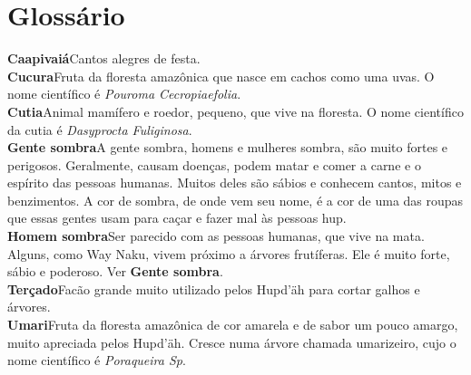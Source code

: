 \blankpage
\chapter{Glossário}


\textbf{Caapivaiá}\quad Cantos alegres de festa.\\
\textbf{Cucura}\quad Fruta da floresta amazônica que nasce em cachos
como uma uvas. O nome científico é \textit{Pouroma Cecropiaefolia}.\\
\textbf{Cutia}\quad Animal mamífero e roedor, pequeno, que vive na floresta. O nome
científico da cutia é \textit{Dasyprocta Fuliginosa}.\\
\textbf{Gente sombra}\quad A gente sombra, homens e mulheres sombra, são
muito fortes e perigosos. Geralmente, causam doenças, podem matar
e comer a carne e o espírito das pessoas humanas. Muitos deles
são sábios e conhecem cantos, mitos e benzimentos. A cor de
sombra, de onde vem seu nome, é a cor de uma das roupas que essas gentes
usam para caçar e fazer mal às pessoas hup.\\
\textbf{Homem sombra}\quad Ser parecido com as pessoas
humanas, que vive na mata. Alguns, como Way Naku, vivem próximo a árvores frutíferas. Ele
é muito forte, sábio e poderoso. Ver \textbf{Gente­ sombra}.\\
\textbf{Terçado}\quad Facão grande muito utilizado pelos Hupd’äh para cortar
galhos e árvores.\\
\textbf{Umari}\quad Fruta da floresta amazônica de cor
amarela e de sabor um pouco amargo, muito apreciada pelos Hupd’äh.
Cresce numa árvore chamada umarizeiro, cujo o nome científico é \textit{Poraqueira Sp}.


